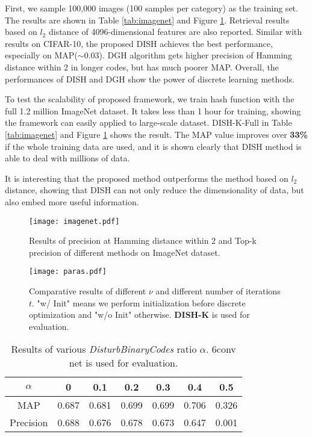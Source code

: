 \documentclass[conference]{IEEEtran}
\begin{document}
First, we sample 100,000 images (100 samples per category) as the training set. The results are shown in Table \ref{tab:imagenet} and Figure \ref{fig:imagenet}. Retrieval results based on $l_2$ distance of 4096-dimensional features are also reported. Similar with results on CIFAR-10, the proposed DISH achieves the best performance, especially on MAP($\sim0.03$). DGH algorithm gets higher precision of Hamming distance within 2 in longer codes, but has much poorer MAP. Overall, the performances of DISH and DGH show the power of discrete learning methods.

To test the scalability of proposed framework, we train hash function with the full 1.2 million ImageNet dataset. It takes less than 1 hour for training, showing the framework can easily applied to large-scale dataset. DISH-K-Full in Table \ref{tab:imagenet} and Figure \ref{fig:imagenet} shows the result. The MAP value improves over \textbf{33\%} if the whole training data are used, and it is shown clearly that DISH method is able to deal with millions of data.

It is interesting that the proposed method outperforms the method based on $l_2$ distance, showing that DISH can not only reduce the dimensionality of data, but also embed more useful information.

\begin{figure}[t]
    \centering
    \texttt{[image: imagenet.pdf]}
    \caption{Results of precision at Hamming distance within 2 and Top-k precision of different methods on ImageNet dataset.}
    \label{fig:imagenet}
\end{figure}


\begin{figure}[t]
    \centering
    \texttt{[image: paras.pdf]}
    \caption{Comparative results of different $\nu$ and different number of iterations $t$. "w/ Init" means we perform initialization before discrete optimization and "w/o Init" otherwise. \textbf{DISH-K} is used for evaluation.}
    \label{fig:nu}
    \label{fig:iteration}
\end{figure}

\begin{table}[t]
    \centering
    \footnotesize
    \begin{tabular}{c|cccccc}
        \hline
        $\alpha$ & 0 & 0.1 & 0.2 & 0.3 & 0.4 & 0.5 \\
        \hline
        MAP & 0.687 & 0.681 & 0.699 & 0.699 & 0.706 & 0.326 \\
        Precision & 0.688 & 0.676 & 0.678 & 0.673 & 0.647 & 0.001 \\
        \hline
    \end{tabular}
    \caption{Results of various {\em DisturbBinaryCodes} ratio $\alpha$. 6conv net is used for evaluation.}
    \label{tab:disturb}
\end{table}
\end{document}
